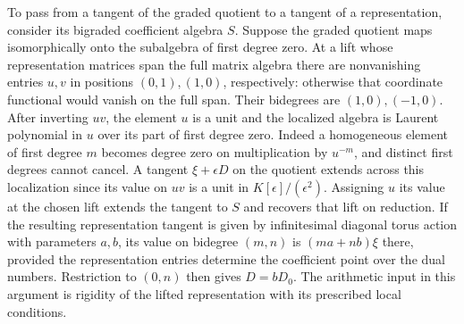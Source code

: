 \documentclass[11pt]{amsart}
\theoremstyle{definition}
\theoremstyle{remark}
\begin{document}
To pass from a tangent of the graded quotient to a tangent of a
representation, consider its bigraded coefficient algebra $S$.
Suppose the graded quotient maps isomorphically onto the subalgebra
of first degree zero. At a lift whose representation matrices span
the full matrix algebra there are nonvanishing entries $u,v$ in
positions $(0,1),(1,0)$, respectively: otherwise that coordinate
functional would vanish on the full span. Their bidegrees are
$(1,0),(-1,0)$. After inverting $uv$, the element $u$ is a unit and
the localized algebra is Laurent polynomial in $u$ over its part
of first degree zero. Indeed a homogeneous element of first degree
$m$ becomes degree zero on multiplication by $u^{-m}$, and
distinct first degrees cannot cancel. A tangent $\xi+\epsilon D$
on the quotient extends across this localization since its value
on $uv$ is a unit in $K[\epsilon]/(\epsilon^2)$. Assigning $u$
its value at the chosen lift extends the tangent to $S$ and recovers
that lift on reduction. If the resulting representation tangent is
given by infinitesimal diagonal torus action with parameters $a,b$,
its value on bidegree $(m,n)$ is $(ma+nb)\xi$ there, provided the
representation entries determine the coefficient point over the dual
numbers. Restriction to $(0,n)$ then gives $D=bD_0$. The arithmetic
input in this argument is rigidity of the lifted representation
with its prescribed local conditions.
\end{document}
